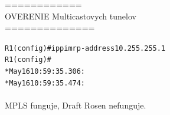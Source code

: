 \documentclass[12pt,twoside,a4paper]{report}
\begin{document}
============\\
OVERENIE Multicastovych tunelov\\
==============\\
\noindent
{\selectfont
\begin{small}
\begin{alltt}
R1(config)#ip pim rp-address 10.255.255.1
R1(config)#
*May 16 10:59:35.306: %
*May 16 10:59:35.474: %
\end{alltt}
\end{small}
}



\paragraph{}
MPLS funguje, Draft Rosen nefunguje.
\end{document}
